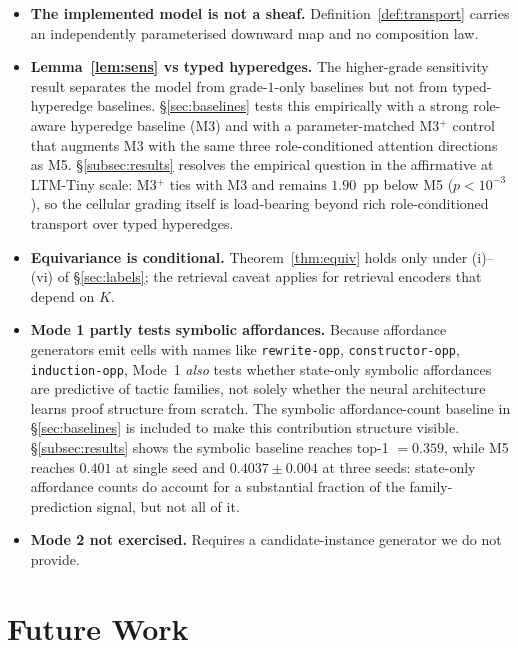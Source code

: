 \documentclass[11pt]{article}
\theoremstyle{definition}
\theoremstyle{plain}
\newcommand{\role}[1]{\texttt{#1}}
\begin{document}
\begin{itemize}
\item \textbf{The implemented model is not a sheaf.} Definition~\ref{def:transport} carries an independently parameterised downward map and no composition law.
\item \textbf{Lemma~\ref{lem:sens} vs typed hyperedges.} The higher-grade sensitivity result separates the model from grade-$1$-only baselines but not from typed-hyperedge baselines. \S\ref{sec:baselines} tests this empirically with a strong role-aware hyperedge baseline (M3) and with a parameter-matched M3$^{+}$ control that augments M3 with the same three role-conditioned attention directions as M5. \S\ref{subsec:results} resolves the empirical question in the affirmative at LTM-Tiny scale: M3$^{+}$ ties with M3 and remains $1.90$~pp below M5 ($p < 10^{-3}$), so the cellular grading itself is load-bearing beyond rich role-conditioned transport over typed hyperedges.
\item \textbf{Equivariance is conditional.} Theorem~\ref{thm:equiv} holds only under (i)--(vi) of \S\ref{sec:labels}; the retrieval caveat applies for retrieval encoders that depend on $K$.
\item \textbf{Mode 1 partly tests symbolic affordances.} Because affordance generators emit cells with names like \role{rewrite-opp}, \role{constructor-opp}, \role{induction-opp}, Mode~1 \emph{also} tests whether state-only symbolic affordances are predictive of tactic families, not solely whether the neural architecture learns proof structure from scratch. The symbolic affordance-count baseline in \S\ref{sec:baselines} is included to make this contribution structure visible. \S\ref{subsec:results} shows the symbolic baseline reaches top-1 $= 0.359$, while M5 reaches $0.401$ at single seed and $0.4037 \pm 0.004$ at three seeds: state-only affordance counts do account for a substantial fraction of the family-prediction signal, but not all of it.
\item \textbf{Mode 2 not exercised.} Requires a candidate-instance generator we do not provide.
\end{itemize}

\section{Future Work}\label{sec:future}
\end{document}
